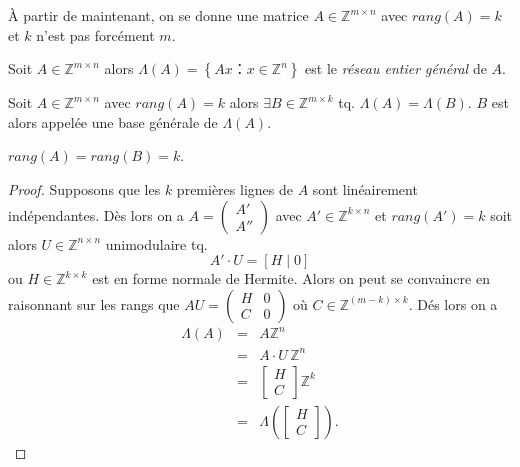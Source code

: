 À partir de maintenant, on se donne une matrice $A\in \mathbb{Z}^{m\times n}$ avec $rang(A)=k$ et $k$ n'est pas forcément $m$.

\begin{definition} \label{def:63}
  Soit  $A\in \mathbb{Z}^{m\times n}$ alors $\Lambda(A)=\left\{ Ax ：x\in \mathbb{Z
    }^{n} \right\} $ est le \emph{réseau entier général} de $A$.
\end{definition}



\begin{theorem}
    \label{thr:28e}
    Soit  $A\in \mathbb{Z}^{m\times n}$ avec $rang(A)=k$ alors $\exists B \in \mathbb{Z}^{m \times k}$ tq. $\Lambda(A)=\Lambda(B)$. $B$ est alors appelée une base générale de $\Lambda(A)$.
    \end{theorem}
    
    \begin{remark}
      $rang(A)=rang(B)=k$.
    \end{remark}
    
    \begin{proof}
      Supposons que les $k$ premières lignes de $A$ sont linéairement
      indépendantes.  Dès lors on a
      $A=\begin{pmatrix} A' \\ A'' \end{pmatrix}$ avec
      $A'\in \mathbb{Z}^{k \times n}$ et $rang(A')=k$ soit alors
      $U\in \mathbb{Z}^{n \times n}$ unimodulaire tq.
      \begin{displaymath}
        A' ⋅ U = [H \mid 0]
      \end{displaymath}
      ou
      $H \in \mathbb{Z}^{k \times k}$ est en forme normale de
      Hermite. Alors on peut se convaincre en raisonnant sur les rangs
      que $AU=\begin{pmatrix} H & 0 \\ C & 0 \end{pmatrix}$ où $C ∈ ℤ^{(m-k)×k}$. Dés lors
      on a
      \begin{eqnarray*}
        \Lambda(A) & = & A\mathbb{Z}^n \\
                   & = & A⋅U \, \mathbb{Z}^n \\
        & = & \left[\begin{matrix} H   \\
          C \end{matrix} \right]\mathbb{Z}^k \\
        & = & \Lambda\left(  \left[\begin{matrix} H   \\
          C \end{matrix} \right]  \right).
      \end{eqnarray*}      
    \end{proof}
    
